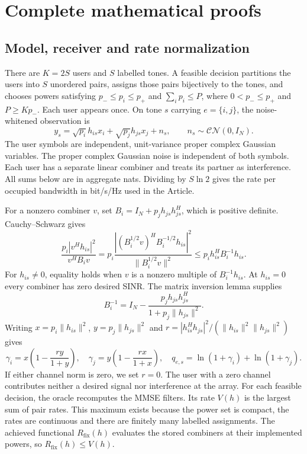 \section{Complete mathematical proofs}
\label{supp:proofs}

\subsection{Model, receiver and rate normalization}
There are $K=2S$ users and $S$ labelled tones. A feasible decision partitions the users into $S$ unordered pairs, assigns those pairs bijectively to the tones, and chooses powers satisfying $p_-\le p_i\le p_+$ and $\sum_i p_i\le P$, where $0<p_-\le p_+$ and $P\ge Kp_-$. Each user appears once. On tone $s$ carrying $e=\{i,j\}$, the noise-whitened observation is
\begin{equation}
 y_s=\sqrt{p_i}h_{is}x_i+\sqrt{p_j}h_{js}x_j+n_s,
 \qquad n_s\sim\mathcal{CN}(0,I_N).
 \label{supp:observation}
\end{equation}
The user symbols are independent, unit-variance proper complex Gaussian variables. The proper complex Gaussian noise is independent of both symbols. Each user has a separate linear combiner and treats its partner as interference. All sums below are in aggregate nats. Dividing by $S\ln2$ gives the rate per occupied bandwidth in bit/s/Hz used in the Article.

For a nonzero combiner $v$, set $B_i=I_N+p_jh_{js}h_{js}^H$, which is positive definite. Cauchy--Schwarz gives
\begin{equation}
 \frac{p_i|v^Hh_{is}|^2}{v^HB_iv}
 =p_i\frac{|(B_i^{1/2}v)^H B_i^{-1/2}h_{is}|^2}
                 {\|B_i^{1/2}v\|^2}
 \le p_i h_{is}^HB_i^{-1}h_{is}.
 \label{supp:mmse-cs}
\end{equation}
For $h_{is}\ne0$, equality holds when $v$ is a nonzero multiple of $B_i^{-1}h_{is}$. At $h_{is}=0$ every combiner has zero desired SINR. The matrix inversion lemma supplies
\begin{equation}
 B_i^{-1}=I_N-\frac{p_jh_{js}h_{js}^H}{1+p_j\|h_{js}\|^2}.
 \label{supp:mmse-inverse}
\end{equation}
Writing $x=p_i\|h_{is}\|^2$, $y=p_j\|h_{js}\|^2$ and
$r=|h_{is}^Hh_{js}|^2/(\|h_{is}\|^2\|h_{js}\|^2)$ gives
\begin{equation}
 \gamma_i=x\left(1-\frac{ry}{1+y}\right),\quad
 \gamma_j=y\left(1-\frac{rx}{1+x}\right),\quad
 q_{e,s}=\ln(1+\gamma_i)+\ln(1+\gamma_j).
 \label{supp:mmse-rate}
\end{equation}
If either channel norm is zero, we set $r=0$. The user with a zero channel contributes neither a desired signal nor interference at the array. For each feasible decision, the oracle recomputes the MMSE filters. Its rate $V(h)$ is the largest sum of pair rates. This maximum exists because the power set is compact, the rates are continuous and there are finitely many labelled assignments. The achieved functional $R_{\mathrm{fix}}(h)$ evaluates the stored combiners at their implemented powers, so $R_{\mathrm{fix}}(h)\le V(h)$.

